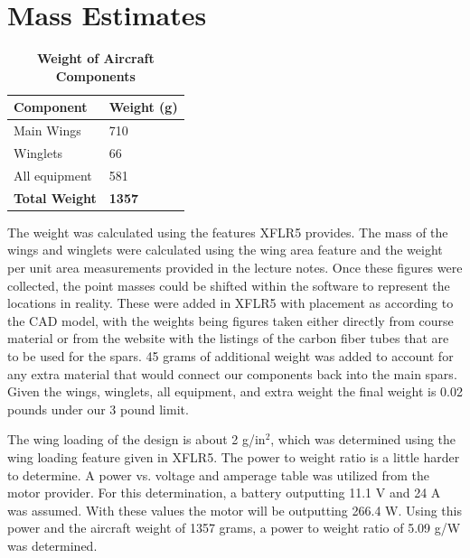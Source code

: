 \section{Mass Estimates}

    \begin{table}[H]
        \begin{center}
        \caption{\textbf{Weight of Aircraft Components}} \label{table:Weights}
        \begin{tabular}{|p{1in}|p{1in}|} %
        \hline
            \textbf{Component} & \textbf{Weight (g)} \\ \hline
            Main Wings & 710 \\ \hline
            Winglets & 66 \\ \hline
            All equipment & 581 \\ \hline
            \textbf{Total Weight} & \textbf{1357} \\ \hline
        \end{tabular}
        \end{center}
    \end{table}

    The weight was calculated using the features XFLR5 provides. The mass of the wings and winglets were calculated using the wing area feature and the weight per unit area measurements provided in the lecture notes. Once these figures were collected, the point masses could be shifted within the software to represent the locations in reality. These were added in XFLR5 with placement as according to the CAD model, with the weights being figures taken either directly from course material or from the website with the listings of the carbon fiber tubes that are to be used for the spars. 45 grams of additional weight was added to account for any extra material that would connect our components back into the main spars. Given the wings, winglets, all equipment, and extra weight the final weight is 0.02 pounds under our 3 pound limit. 
    
    The wing loading of the design is about 2 g/in$^2$, which was determined using the wing loading feature given in XFLR5. The power to weight ratio is a little harder to determine. A power vs. voltage and amperage table was utilized from the motor provider. For this determination, a battery outputting 11.1 V and 24 A was assumed. With these values the motor will be outputting 266.4 W. Using this power and the aircraft weight of 1357 grams, a power to weight ratio of 5.09 g/W was determined.



